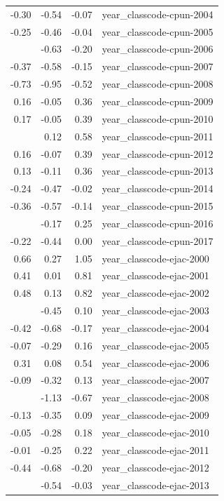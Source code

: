 \documentclass[]{article}
\begin{document}
\begin{longtable}[t]{rrrl}
-0.30 & -0.54 & -0.07 & year\_classcode-cpun-2004\\
-0.25 & -0.46 & -0.04 & year\_classcode-cpun-2005\\
\addlinespace
-0.41 & -0.63 & -0.20 & year\_classcode-cpun-2006\\
-0.37 & -0.58 & -0.15 & year\_classcode-cpun-2007\\
-0.73 & -0.95 & -0.52 & year\_classcode-cpun-2008\\
0.16 & -0.05 & 0.36 & year\_classcode-cpun-2009\\
0.17 & -0.05 & 0.39 & year\_classcode-cpun-2010\\
\addlinespace
0.35 & 0.12 & 0.58 & year\_classcode-cpun-2011\\
0.16 & -0.07 & 0.39 & year\_classcode-cpun-2012\\
0.13 & -0.11 & 0.36 & year\_classcode-cpun-2013\\
-0.24 & -0.47 & -0.02 & year\_classcode-cpun-2014\\
-0.36 & -0.57 & -0.14 & year\_classcode-cpun-2015\\
\addlinespace
0.04 & -0.17 & 0.25 & year\_classcode-cpun-2016\\
-0.22 & -0.44 & 0.00 & year\_classcode-cpun-2017\\
0.66 & 0.27 & 1.05 & year\_classcode-ejac-2000\\
0.41 & 0.01 & 0.81 & year\_classcode-ejac-2001\\
0.48 & 0.13 & 0.82 & year\_classcode-ejac-2002\\
\addlinespace
-0.18 & -0.45 & 0.10 & year\_classcode-ejac-2003\\
-0.42 & -0.68 & -0.17 & year\_classcode-ejac-2004\\
-0.07 & -0.29 & 0.16 & year\_classcode-ejac-2005\\
0.31 & 0.08 & 0.54 & year\_classcode-ejac-2006\\
-0.09 & -0.32 & 0.13 & year\_classcode-ejac-2007\\
\addlinespace
-0.90 & -1.13 & -0.67 & year\_classcode-ejac-2008\\
-0.13 & -0.35 & 0.09 & year\_classcode-ejac-2009\\
-0.05 & -0.28 & 0.18 & year\_classcode-ejac-2010\\
-0.01 & -0.25 & 0.22 & year\_classcode-ejac-2011\\
-0.44 & -0.68 & -0.20 & year\_classcode-ejac-2012\\
\addlinespace
-0.28 & -0.54 & -0.03 & year\_classcode-ejac-2013\\

\end{longtable}
\end{document}
